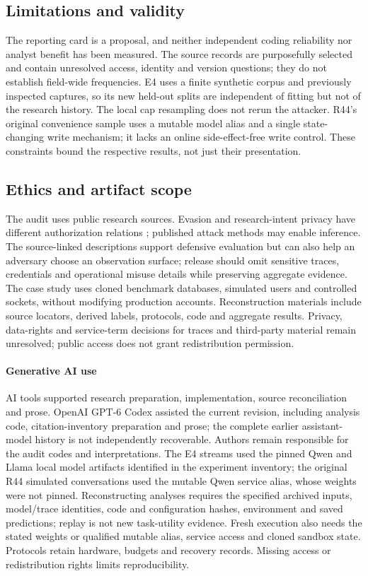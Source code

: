 \subsection{Limitations and validity}\label{sec:validity}
The reporting card is a proposal, and neither independent coding reliability nor analyst benefit has been measured. The source records are purposefully selected and contain unresolved access, identity and version questions; they do not establish field-wide frequencies. E4 uses a finite synthetic corpus and previously inspected captures, so its new held-out splits are independent of fitting but not of the research history. The local cap resampling does not rerun the attacker. R44's original convenience sample uses a mutable model alias and a single state-changing write mechanism; it lacks an online side-effect-free write control. These constraints bound the respective results, not just their presentation.

\subsection{Ethics and artifact scope}\label{sec:ethics}
The audit uses public research sources. Evasion and research-intent privacy have different authorization relations \cite{zhu2026turing,jeong2026wra}; published attack methods may enable inference. The source-linked descriptions support defensive evaluation but can also help an adversary choose an observation surface; release should omit sensitive traces, credentials and operational misuse details while preserving aggregate evidence. The case study uses cloned benchmark databases, simulated users and controlled sockets, without modifying production accounts. Reconstruction materials include source locators, derived labels, protocols, code and aggregate results. Privacy, data-rights and service-term decisions for traces and third-party material remain unresolved; public access does not grant redistribution permission.

\paragraph{Generative AI use}
AI tools supported research preparation, implementation, source reconciliation and prose. OpenAI GPT-6 Codex assisted the current revision, including analysis code, citation-inventory preparation and prose; the complete earlier assistant-model history is not independently recoverable. Authors remain responsible for the audit codes and interpretations. The E4 streams used the pinned Qwen and Llama local model artifacts identified in the experiment inventory; the original R44 simulated conversations used the mutable Qwen service alias, whose weights were not pinned. Reconstructing analyses requires the specified archived inputs, model/trace identities, code and configuration hashes, environment and saved predictions; replay is not new task-utility evidence. Fresh execution also needs the stated weights or qualified mutable alias, service access and cloned sandbox state. Protocols retain hardware, budgets and recovery records. Missing access or redistribution rights limits reproducibility.
